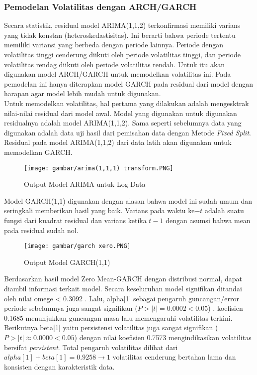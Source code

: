 \documentclass[a4paper,12pt]{article}
\begin{document}
\subsubsection{Pemodelan Volatilitas dengan ARCH/GARCH}

Secara statistik, residual model ARIMA(1,1,2) terkonfirmasi memiliki varians yang tidak konstan (heteroskedastisitas). Ini berarti bahwa periode tertentu memiliki variansi yang berbeda dengan periode lainnya. Periode dengan volatilitas tinggi cenderung diikuti oleh periode volatilitas tinggi, dan periode volatilitas rendag diikuti oleh periode volatilitas rendah. Untuk itu akan digunakan model ARCH/GARCH untuk memodelkan volatilitas ini. Pada pemodelan ini hanya diterapkan model GARCH pada residual dari model dengan harapan agar model lebih mudah untuk digunakan. \\

Untuk memodelkan volatilitas, hal pertama yang dilakukan adalah mengesktrak nilai-nilai residual dari model awal. Model yang digunakan untuk digunakan residualnya adalah model ARIMA(1,1,2). Sama seperti sebelumnya data yang digunakan adalah data uji hasil dari pemisahan data dengan Metode \textit{Fixed Split}. Residual pada model ARIMA(1,1,2) dari data latih akan digunakan untuk memodelkan GARCH. \\

\begin{figure}[htb!]
    \centering
    \texttt{[image: gambar/arima(1,1,1) transform.PNG]}
    \caption{Output Model ARIMA untuk Log Data}
    \label{fig:arima log}
\end{figure}

Model GARCH(1,1) digunakan dengan alasan bahwa model ini sudah umum dan seringkali memberikan hasil yang baik. Varians pada waktu ke$-t$ adalah suatu fungsi dari kuadrat residual dan varians ketika $t-1$ dengan asumsi bahwa mean pada residual sudah nol. 

\begin{figure}[htb!]
    \centering
    \texttt{[image: gambar/garch xero.PNG]}
    \caption{Output Model GARCH(1,1)}
    \label{fig:garch(1,1)}
\end{figure}
Berdasarkan hasil model Zero Mean-GARCH dengan distribusi normal, dapat diambil informasi terkait model. Secara keseluruhan model signifikan ditandai oleh nilai omege < 0.3092 . Lalu, alpha[1] sebagai pengaruh guncangan/error periode sebelumnya juga sangat signifikan ($P>|t| = 0.0002 < 0.05$) , koefisien 0.1685 menunjukkan guncangan masa lalu memengaruhi volatilitas terkini. Berikutnya beta[1] yaitu persistensi volatilitas juga sangat signifikan ($P>|t| \approx 0.0000 < 0.05$) dengan nilai koefisien 0.7573 mengindikasikan volatilitas bersifat \textit{persistent}. Total pengaruh volatilitas dilihat dari $alpha[1]+beta[1] = 0.9258 \rightarrow1$ volatilitas cenderung bertahan lama dan konsisten dengan karakteristik data.
\end{document}
